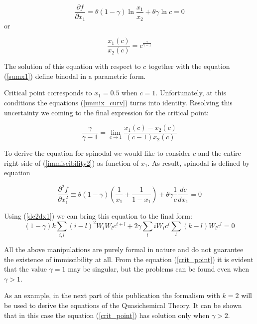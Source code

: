 \documentclass[12pt,abstract]{scrartcl}
\begin{document}
\begin{equation} \label{immiscibility2}
\frac{\partial f}{\partial x_1} = \theta (1 - \gamma) \ln{\frac{x_1}{x_2}} + \theta \gamma \ln{c} = 0
\end{equation}
or

\begin{equation} \label{unmix_curv}
\frac {x_1(c)}{x_2(c)} = c ^{\frac{\gamma}{\gamma - 1}}
\end{equation}

The solution of this equation with respect to  $c$  together with the equation (\ref{sumx1}) define binodal in a parametric form.


Critical point corresponds to $x_1 = 0.5$ when $c = 1$. Unfortunately, at this conditions the equations (\ref{unmix_curv}) turns into identity. Resolving this uncertainty we coming to the final expression for the critical point:

 \begin{equation} \label{crit_point}
 \frac{\gamma}{\gamma - 1} = \lim_{c \to 1} \frac{x_1(c) - x_2(c)}{(c - 1) x_2(c)}
\end{equation}


To derive the equation for spinodal \cite{Hillert2008} we would like to consider $c$ and the entire right side of (\ref{immiscibility2}) as function of $x_1$. As result, spinodal is defined by equation

 \begin{equation} \label{spinodal}
 \frac{\partial^2 f}{\partial x_1^2} \equiv \theta (1 -\gamma)  (\frac{1}{x_1} + \frac{1}{1 - x_1})  + \theta \gamma \frac{1}{c} \frac{dc}{dx_1} = 0
\end{equation}

Using (\ref{dc2dx1}) we can bring this equation to the final form:
\begin{equation} \label{spinodal2}
 (1 -\gamma) k   \sum\limits_{i, l} \left(i-l \right)^2 W_i W_l c^{i+l} + 2  \gamma \sum\limits_i i   W_i c^i \sum\limits_l  (k-l) W_l c^l  = 0
\end{equation}


All the above manipulations are purely formal in nature and do not guarantee the   existence of immiscibility at all. 
From the  equation (\ref{crit_point})  it is evident that the value $\gamma = 1$ may be singular, but the problems can be found even when 
$\gamma > 1$.  


As an example, in the next part of this publication \cite{TISR_p2} the formalism with $k=2$ will be used to derive the equations of the Quasichemical Theory. It can be shown that in this case the equation  (\ref{crit_point}) has solution only when $\gamma > 2$.
\end{document}
